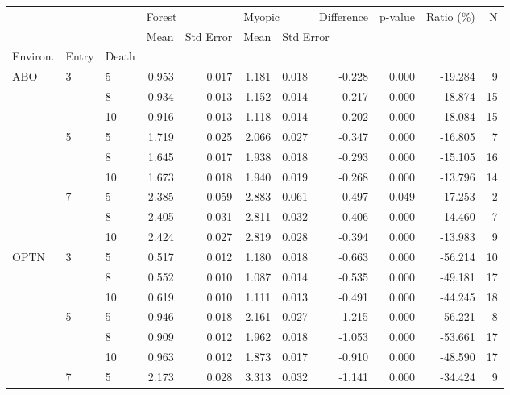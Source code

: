 \begin{tabular}{lllrrrrrrrr}
\toprule
    &   &    & \multicolumn{2}{l}{Forest} & \multicolumn{2}{l}{Myopic} & Difference & p-value & Ratio (\%) &   N \\
    &   &    &   Mean & Std Error &   Mean & \multicolumn{5}{l}{Std Error} \\
Environ. & Entry & Death &        &           &        &           &            &         &           &     \\
\midrule
ABO & 3 & 5  &  0.953 &     0.017 &  1.181 &     0.018 &     -0.228 &   0.000 &   -19.284 &   9 \\
    &   & 8  &  0.934 &     0.013 &  1.152 &     0.014 &     -0.217 &   0.000 &   -18.874 &  15 \\
    &   & 10 &  0.916 &     0.013 &  1.118 &     0.014 &     -0.202 &   0.000 &   -18.084 &  15 \\
    & 5 & 5  &  1.719 &     0.025 &  2.066 &     0.027 &     -0.347 &   0.000 &   -16.805 &   7 \\
    &   & 8  &  1.645 &     0.017 &  1.938 &     0.018 &     -0.293 &   0.000 &   -15.105 &  16 \\
    &   & 10 &  1.673 &     0.018 &  1.940 &     0.019 &     -0.268 &   0.000 &   -13.796 &  14 \\
    & 7 & 5  &  2.385 &     0.059 &  2.883 &     0.061 &     -0.497 &   0.049 &   -17.253 &   2 \\
    &   & 8  &  2.405 &     0.031 &  2.811 &     0.032 &     -0.406 &   0.000 &   -14.460 &   7 \\
    &   & 10 &  2.424 &     0.027 &  2.819 &     0.028 &     -0.394 &   0.000 &   -13.983 &   9 \\
OPTN & 3 & 5  &  0.517 &     0.012 &  1.180 &     0.018 &     -0.663 &   0.000 &   -56.214 &  10 \\
    &   & 8  &  0.552 &     0.010 &  1.087 &     0.014 &     -0.535 &   0.000 &   -49.181 &  17 \\
    &   & 10 &  0.619 &     0.010 &  1.111 &     0.013 &     -0.491 &   0.000 &   -44.245 &  18 \\
    & 5 & 5  &  0.946 &     0.018 &  2.161 &     0.027 &     -1.215 &   0.000 &   -56.221 &   8 \\
    &   & 8  &  0.909 &     0.012 &  1.962 &     0.018 &     -1.053 &   0.000 &   -53.661 &  17 \\
    &   & 10 &  0.963 &     0.012 &  1.873 &     0.017 &     -0.910 &   0.000 &   -48.590 &  17 \\
    & 7 & 5  &  2.173 &     0.028 &  3.313 &     0.032 &     -1.141 &   0.000 &   -34.424 &   9 \\

\end{tabular}
